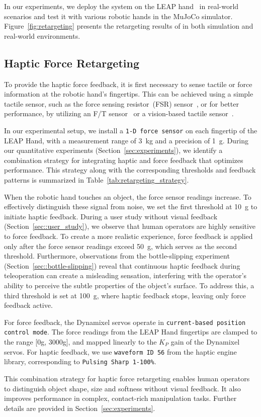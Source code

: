 In our experiments, we deploy the system on the LEAP hand~\cite{shaw2023leaphand} in real-world scenarios and test it with various robotic hands in the MuJoCo simulator. Figure~\ref{fig:retargeting} presents the retargeting results of \oursystem in both simulation and real-world environments.
 
\subsection{Haptic Force Retargeting}
\label{sec::haptic_force_retargeting}
To provide the haptic force feedback, it is first necessary to sense tactile or force information at the robotic hand's fingertips. This can be achieved using a simple tactile sensor, such as the force sensing resistor~(FSR) sensor~\cite{ding2024bunny, kappassov2015tactile}, or for better performance, by utilizing an F/T sensor~\cite{kim2020six, chen2025dexforce} or a vision-based tactile sensor~\cite{yuan2017gelsight, lin20239dtact}.

In our experimental setup, we install a \texttt{1-D force sensor} on each fingertip of the LEAP Hand, with a measurement range of 3~kg and a precision of 1~g. During our quantitative experiments (Section~\ref{sec:experiments}), we identify a combination strategy for integrating haptic and force feedback that optimizes performance. This strategy along with the corresponding thresholds and feedback patterns is summarized in Table~\ref{tab:retargeting_strategy}.



When the robotic hand touches an object, the force sensor readings increase. To effectively distinguish these signal from noise, we set the first threshold at 10~g to initiate haptic feedback. During a user study without visual feedback (Section~\ref{sec::user_study}), we observe that human operators are highly sensitive to force feedback. To create a more realistic experience, force feedback is applied only after the force sensor readings exceed 50~g, which serves as the second threshold. Furthermore, observations from the bottle-slipping experiment (Section~\ref{sec::bottle-slipping}) reveal that continuous haptic feedback during teleoperation can create a misleading sensation, interfering with the operator's ability to perceive the subtle properties of the object's surface. To address this, a third threshold is set at 100~g, where haptic feedback stops, leaving only force feedback active.

For force feedback, the Dynamixel servos operate in \texttt{current-based position control mode}. The force readings from the LEAP Hand fingertips are clamped to the range [0g, 3000g], and mapped linearly to the $K_P$ gain of the Dynamixel servos. For haptic feedback, we use \texttt{waveform ID~56} from the haptic engine library, corresponding to \texttt{Pulsing Sharp 1-100\%}.

This combination strategy for haptic force retargeting enables human operators to distinguish object shape, size and softness without visual feedback. It also improves performance in complex, contact-rich manipulation tasks. Further details are provided in Section~\ref{sec:experiments}.